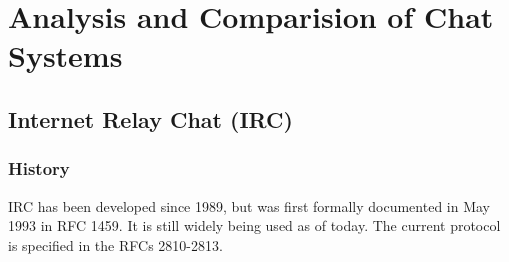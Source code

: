 \chapter{Analysis and Comparision of Chat Systems}
\label{chatsystems}
\section{Internet Relay Chat (IRC)}
\subsection{History}
IRC has been developed since 1989, but was first formally documented in May 1993 in 
RFC 1459. It is still widely being used as of today.\cite{rfc1459,ircusage}
The current protocol is specified in the RFCs 2810-2813.\cite{rfc2810,rfc2811,rfc2812,rfc2813}
